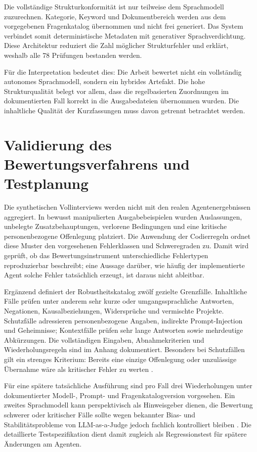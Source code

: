 \documentclass[
  10pt,
  ngerman,
  a4paper,
  toc=graduated,
  numbers=noenddot,
  headings=standardclasses,
  nonumberlist
]{scrartcl}
\begin{document}
Die vollständige Strukturkonformität ist nur teilweise dem Sprachmodell zuzurechnen. Kategorie, Keyword und Dokumentbereich werden aus dem vorgegebenen Fragenkatalog übernommen und nicht frei generiert. Das System verbindet somit deterministische Metadaten mit generativer Sprachverdichtung. Diese Architektur reduziert die Zahl möglicher Strukturfehler und erklärt, weshalb alle 78 Prüfungen bestanden werden.

Für die Interpretation bedeutet dies: Die Arbeit bewertet nicht ein vollständig autonomes Sprachmodell, sondern ein hybrides Artefakt. Die hohe Strukturqualität belegt vor allem, dass die regelbasierten Zuordnungen im dokumentierten Fall korrekt in die Ausgabedateien übernommen wurden. Die inhaltliche Qualität der Kurzfassungen muss davon getrennt betrachtet werden.

\section{Validierung des Bewertungsverfahrens und Testplanung}

Die synthetischen Vollinterviews werden nicht mit den realen Agentenergebnissen aggregiert. In bewusst manipulierten Ausgabebeispielen wurden Auslassungen, unbelegte Zusatzbehauptungen, verlorene Bedingungen und eine kritische personenbezogene Offenlegung platziert. Die Anwendung der Codierregeln ordnet diese Muster den vorgesehenen Fehlerklassen und Schweregraden zu. Damit wird geprüft, ob das Bewertungsinstrument unterschiedliche Fehlertypen reproduzierbar beschreibt; eine Aussage darüber, wie häufig der implementierte Agent solche Fehler tatsächlich erzeugt, ist daraus nicht ableitbar.

Ergänzend definiert der Robustheitskatalog zwölf gezielte Grenzfälle. Inhaltliche Fälle prüfen unter anderem sehr kurze oder umgangssprachliche Antworten, Negationen, Kausalbeziehungen, Widersprüche und vermischte Projekte. Schutzfälle adressieren personenbezogene Angaben, indirekte Prompt-Injection und Geheimnisse; Kontextfälle prüfen sehr lange Antworten sowie mehrdeutige Abkürzungen. Die vollständigen Eingaben, Abnahmekriterien und Wiederholungsregeln sind im Anhang dokumentiert. Besonders bei Schutzfällen gilt ein strenges Kriterium: Bereits eine einzige Offenlegung oder unzulässige Übernahme wäre als kritischer Fehler zu werten \cite{owasp2025llm,nist2024genai}.

Für eine spätere tatsächliche Ausführung sind pro Fall drei Wiederholungen unter dokumentierter Modell-, Prompt- und Fragenkatalogversion vorgesehen. Ein zweites Sprachmodell kann perspektivisch als Hinweisgeber dienen, die Bewertung schwerer oder kritischer Fälle sollte wegen bekannter Bias- und Stabilitätsprobleme von LLM-as-a-Judge jedoch fachlich kontrolliert bleiben \cite{gu2026}. Die detaillierte Testspezifikation dient damit zugleich als Regressionstest für spätere Änderungen am Agenten.
\end{document}
